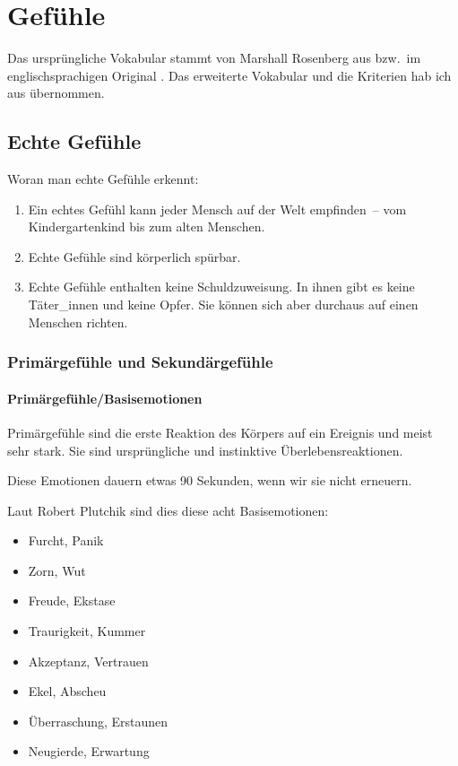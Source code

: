 \section{Gefühle}
\label{gefuehle}

Das ursprüngliche Vokabular stammt von Marshall Rosenberg aus \cite[S.~216]{gfk-rosenberg} bzw.~im englischsprachigen Original \cite[S.~210]{nvc-rosenberg}. Das erweiterte Vokabular und die Kriterien hab ich aus \cite[S.~56~f]{gfk-dummies} übernommen.


\subsection{Echte Gefühle}

Woran man echte Gefühle erkennt:

\begin{enumerate}
 \item Ein echtes Gefühl kann jeder Mensch auf der Welt empfinden~-- vom Kindergartenkind bis zum alten Menschen.
 \item Echte Gefühle sind körperlich spürbar.
 \item Echte Gefühle enthalten keine Schuldzuweisung. In ihnen gibt es keine Täter\_innen und keine Opfer. Sie können sich aber durchaus auf einen Menschen richten.
\end{enumerate}

\subsubsection{Primärgefühle und Sekundärgefühle}

\paragraph{Primärgefühle/Basisemotionen}

Primärgefühle sind die erste Reaktion des Körpers auf ein Ereignis und meist sehr stark. Sie sind ursprüngliche und instinktive Überlebensreaktionen.

Diese Emotionen dauern etwas 90 Sekunden, wenn wir sie nicht \glqq erneuern\grqq.

Laut Robert Plutchik\cite{plutchik-emotions} sind dies diese acht Basisemotionen:

\begin{itemize}
  \item Furcht, Panik
  \item Zorn, Wut
  \item Freude, Ekstase
  \item Traurigkeit, Kummer
  \item Akzeptanz, Vertrauen
  \item Ekel, Abscheu
  \item Überraschung, Erstaunen
  \item Neugierde, Erwartung
\end{itemize}

